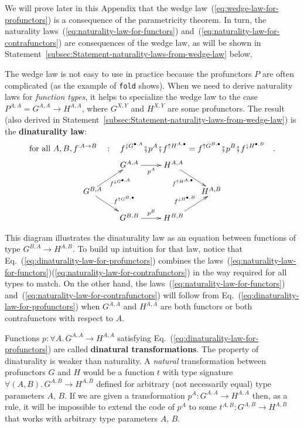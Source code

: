 We will prove later in this Appendix that the wedge law~(\ref{eq:wedge-law-for-profunctors})
is a consequence of the parametricity theorem. In turn, the naturality
laws~(\ref{eq:naturality-law-for-functors}) and~(\ref{eq:naturality-law-for-contrafunctors})
are consequences of the wedge law, as will be shown in Statement~\ref{subsec:Statement-naturality-laws-from-wedge-law}
below.

The wedge law is not easy to use in practice because the profunctors
$P$ are often complicated (as the example of \lstinline!fold! shows).
When we need to derive naturality laws for \emph{function types},
it helps to specialize the wedge law to the case $P^{A,A}=G^{A,A}\rightarrow H^{A,A}$,
where $G^{X,Y}$ and $H^{X,Y}$ are some profunctors. The result (also
derived in Statement~\ref{subsec:Statement-naturality-laws-from-wedge-law})
is the \textbf{dinaturality law}:
\begin{equation}
\text{for all }A,B,f^{:A\rightarrow B}\quad:\quad f^{\downarrow G^{\bullet,A}}\bef p^{A}\bef f^{\uparrow H^{A,\bullet}}=f^{\uparrow G^{B,\bullet}}\bef p^{B}\bef f^{\downarrow H^{\bullet,B}}\quad.\label{eq:dinaturality-law-for-profunctors}
\end{equation}
\[
\xymatrix{\xyScaleY{1.5pc}\xyScaleX{2.0pc} & G^{A,A}\ar[r]\sb(0.5){p^{A}} & H^{A,A}\ar[rd]\sb(0.4){f^{\uparrow H^{A,\bullet}}\negthickspace}\\
G^{B,A}\negthickspace\negthickspace\negthickspace\ar[rd]\sp(0.55){~~f^{\uparrow G^{B,\bullet}}}\ar[ru]\sb(0.6){\negthickspace f^{\downarrow G^{\bullet,A}}} &  &  & \negthickspace\negthickspace\negthickspace H^{A,B}\\
 & G^{B,B}\ar[r]\sp(0.5){p^{B}} & H^{B,B}\ar[ru]\sp(0.45){f^{\downarrow H^{\bullet,B}}\negthickspace}
}
\]

This diagram illustrates the dinaturality law as an equation between
functions of type $G^{B,A}\rightarrow H^{A,B}$. To build up intuition
for that law, notice that Eq.~(\ref{eq:dinaturality-law-for-profunctors})
combines the laws~(\ref{eq:naturality-law-for-functors})\textendash (\ref{eq:naturality-law-for-contrafunctors})
in the way required for all types to match. On the other hand, the
laws~(\ref{eq:naturality-law-for-functors}) and~(\ref{eq:naturality-law-for-contrafunctors})
will follow from Eq.~(\ref{eq:dinaturality-law-for-profunctors})
when $G^{A,A}$ and $H^{A,A}$ are both functors or both contrafunctors
with respect to $A$.

Functions $p:\forall A.\,G^{A,A}\rightarrow H^{A,A}$ satisfying Eq.~(\ref{eq:dinaturality-law-for-profunctors})
are called \textbf{dinatural transformations}.
The property of dinaturality is weaker than naturality.\emph{ }A \emph{natural}
transformation between profunctors $G$ and $H$ would be a function
$t$ with type signature $\forall(A,B).\,G^{A,B}\rightarrow H^{A,B}$
defined for arbitrary (not necessarily equal) type parameters $A$,
$B$. If we are given a transformation $p^{A}:G^{A,A}\rightarrow H^{A,A}$
then, as a rule, it will be impossible to extend the code of $p^{A}$
to some $t^{A,B}:G^{A,B}\rightarrow H^{A,B}$ that works with arbitrary
type parameters $A$, $B$.

